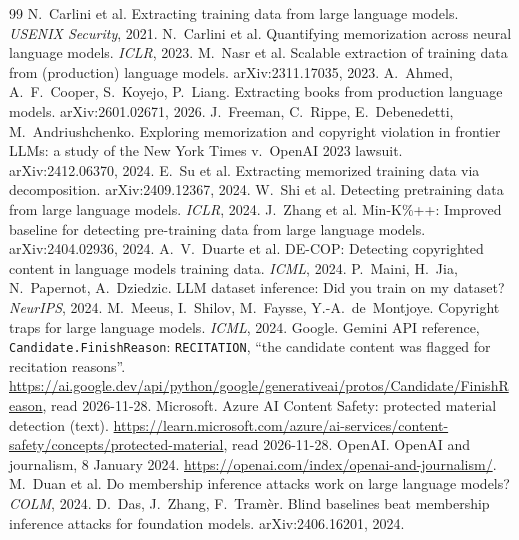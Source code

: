 \documentclass[10pt,a4paper]{article}
\begin{document}
\begin{thebibliography}{99}\small
{} N.~Carlini et al. Extracting training data from large language models. \emph{USENIX Security}, 2021.
 N.~Carlini et al. Quantifying memorization across neural language models. \emph{ICLR}, 2023.
 M.~Nasr et al. Scalable extraction of training data from (production) language models. arXiv:2311.17035, 2023.
 A.~Ahmed, A.~F.~Cooper, S.~Koyejo, P.~Liang. Extracting books from production language models. arXiv:2601.02671, 2026.
 J.~Freeman, C.~Rippe, E.~Debenedetti, M.~Andriushchenko. Exploring memorization and copyright violation in frontier LLMs: a study of the New York Times v.\ OpenAI 2023 lawsuit. arXiv:2412.06370, 2024.
 E.~Su et al. Extracting memorized training data via decomposition. arXiv:2409.12367, 2024.
 W.~Shi et al. Detecting pretraining data from large language models. \emph{ICLR}, 2024.
 J.~Zhang et al. Min-K\%++: Improved baseline for detecting pre-training data from large language models. arXiv:2404.02936, 2024.
 A.~V.~Duarte et al. DE-COP: Detecting copyrighted content in language models training data. \emph{ICML}, 2024.
 P.~Maini, H.~Jia, N.~Papernot, A.~Dziedzic. LLM dataset inference: Did you train on my dataset? \emph{NeurIPS}, 2024.
 M.~Meeus, I.~Shilov, M.~Faysse, Y.-A.~de~Montjoye. Copyright traps for large language models. \emph{ICML}, 2024.
 Google. Gemini API reference, \texttt{Candidate.FinishReason}: \texttt{RECITATION}, ``the candidate content was flagged for recitation reasons''. \url{https://ai.google.dev/api/python/google/generativeai/protos/Candidate/FinishReason}, read 2026-11-28.
 Microsoft. Azure AI Content Safety: protected material detection (text). \url{https://learn.microsoft.com/azure/ai-services/content-safety/concepts/protected-material}, read 2026-11-28.
 OpenAI. OpenAI and journalism, 8 January 2024. \url{https://openai.com/index/openai-and-journalism/}.
 M.~Duan et al. Do membership inference attacks work on large language models? \emph{COLM}, 2024.
 D.~Das, J.~Zhang, F.~Tram\`er. Blind baselines beat membership inference attacks for foundation models. arXiv:2406.16201, 2024.
\end{thebibliography}

\appendix
\end{document}
